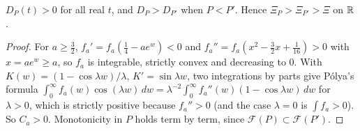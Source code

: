 \begin{theorem}\label{mi:thm:positive}
$D_P(t)>0$ for all real $t$, and $D_P>D_{P'}$ when $P<P'$. Hence $\Xi_P>\Xi_{P'}>\Xi$ on $\mathbb{R}$.
\end{theorem}

\begin{proof}
For $a\ge\tfrac32$, $f_a'=f_a(\frac14-ae^w)<0$ and $f_a''=f_a(x^2-\tfrac32x+\tfrac1{16})>0$ with $x=ae^w\ge a$, so $f_a$ is integrable, strictly convex and decreasing to $0$. With $K(w)=(1-\cos\lambda w)/\lambda$, $K'=\sin\lambda w$, two integrations by parts give P\'olya's formula $\int_0^\infty f_a(w)\cos(\lambda w)\,dw=\lambda^{-2}\int_0^\infty f_a''(w)(1-\cos\lambda w)\,dw$ for $\lambda>0$, which is strictly positive because $f_a''>0$ (and the case $\lambda=0$ is $\int f_a>0$). So $C_a>0$. Monotonicity in $P$ holds term by term, since $\mathcal F(P)\subset\mathcal F(P')$.
\end{proof}

